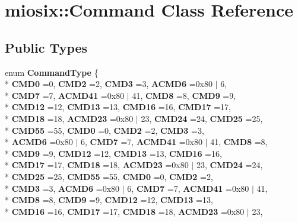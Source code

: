 \hypertarget{classmiosix_1_1_command}{\section{miosix\-:\-:Command Class Reference}
\label{classmiosix_1_1_command}
}
\subsection*{Public Types}
\begin{DoxyCompactItemize}
\item 
enum {\bfseries Command\-Type} \{ \\*
{\bfseries C\-M\-D0} =0, 
{\bfseries C\-M\-D2} =2, 
{\bfseries C\-M\-D3} =3, 
{\bfseries A\-C\-M\-D6} =0x80 $\vert$ 6, 
\\*
{\bfseries C\-M\-D7} =7, 
{\bfseries A\-C\-M\-D41} =0x80 $\vert$ 41, 
{\bfseries C\-M\-D8} =8, 
{\bfseries C\-M\-D9} =9, 
\\*
{\bfseries C\-M\-D12} =12, 
{\bfseries C\-M\-D13} =13, 
{\bfseries C\-M\-D16} =16, 
{\bfseries C\-M\-D17} =17, 
\\*
{\bfseries C\-M\-D18} =18, 
{\bfseries A\-C\-M\-D23} =0x80 $\vert$ 23, 
{\bfseries C\-M\-D24} =24, 
{\bfseries C\-M\-D25} =25, 
\\*
{\bfseries C\-M\-D55} =55, 
{\bfseries C\-M\-D0} =0, 
{\bfseries C\-M\-D2} =2, 
{\bfseries C\-M\-D3} =3, 
\\*
{\bfseries A\-C\-M\-D6} =0x80 $\vert$ 6, 
{\bfseries C\-M\-D7} =7, 
{\bfseries A\-C\-M\-D41} =0x80 $\vert$ 41, 
{\bfseries C\-M\-D8} =8, 
\\*
{\bfseries C\-M\-D9} =9, 
{\bfseries C\-M\-D12} =12, 
{\bfseries C\-M\-D13} =13, 
{\bfseries C\-M\-D16} =16, 
\\*
{\bfseries C\-M\-D17} =17, 
{\bfseries C\-M\-D18} =18, 
{\bfseries A\-C\-M\-D23} =0x80 $\vert$ 23, 
{\bfseries C\-M\-D24} =24, 
\\*
{\bfseries C\-M\-D25} =25, 
{\bfseries C\-M\-D55} =55, 
{\bfseries C\-M\-D0} =0, 
{\bfseries C\-M\-D2} =2, 
\\*
{\bfseries C\-M\-D3} =3, 
{\bfseries A\-C\-M\-D6} =0x80 $\vert$ 6, 
{\bfseries C\-M\-D7} =7, 
{\bfseries A\-C\-M\-D41} =0x80 $\vert$ 41, 
\\*
{\bfseries C\-M\-D8} =8, 
{\bfseries C\-M\-D9} =9, 
{\bfseries C\-M\-D12} =12, 
{\bfseries C\-M\-D13} =13, 
\\*
{\bfseries C\-M\-D16} =16, 
{\bfseries C\-M\-D17} =17, 
{\bfseries C\-M\-D18} =18, 
{\bfseries A\-C\-M\-D23} =0x80 $\vert$ 23, 

\end{DoxyCompactItemize}
